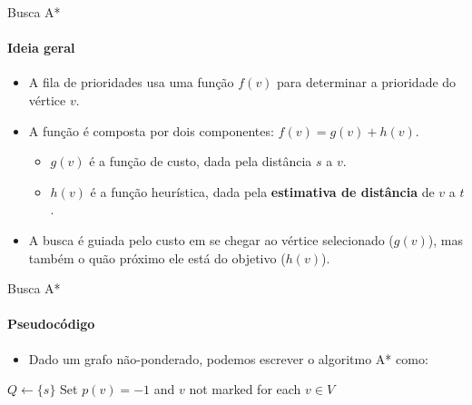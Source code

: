 \begin{frame}{Busca A*}
\framesubtitle{Ideia geral}

\begin{itemize}
	\item A fila de prioridades usa uma função $f(v)$ para determinar a prioridade do vértice $v$.
	\item A função é composta por dois componentes: $f(v) = g(v) + h(v)$.
	\begin{itemize}
		\item $g(v)$ é a função de custo, dada pela distância $s$ a $v$.
		\item $h(v)$ é a função heurística, dada pela \textbf{estimativa de distância} de $v$ a $t$.
	\end{itemize}

	\item A busca é guiada pelo custo em se chegar ao vértice selecionado ($g(v)$), mas também o quão próximo ele está do objetivo ($h(v)$).
\end{itemize}
\end{frame}



\begin{frame}{Busca A*}
\framesubtitle{Pseudocódigo}

\begin{itemize}
	\item Dado um grafo não-ponderado, podemos escrever o algoritmo A* como:
\end{itemize}

\begin{algorithm}[H]
	\DontPrintSemicolon
	
	$Q \gets \{s\}$\;
	Set $p(v) = -1$ and $v$ not marked for each $v \in V$\;
	
	
	\caption{\texttt{A$^\texttt{*}$(Vertex s, Vertex t)}}
\end{algorithm}
\end{frame}



